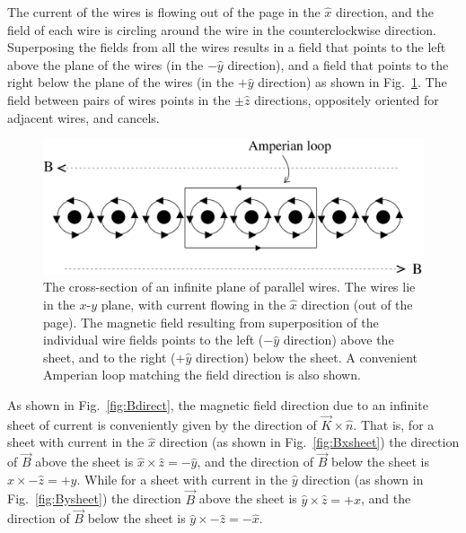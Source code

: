 \documentclass[12pt]{article}
\begin{document}
\begin{flushleft}
The current of the wires is flowing out of the page in the $\hat{x}$ direction, and the field of each wire is circling around the wire in the counterclockwise direction.  Superposing the fields from all the wires results in a field that points to the left above the plane of the wires (in the $-\hat{y}$ direction), and a field that points to the right below the plane of the wires (in the $+\hat{y}$ direction) as shown in Fig.~\ref{fig:sheetwB}.  The field between pairs of wires points in the $\pm \hat{z}$ directions, oppositely oriented for adjacent wires, and cancels.
\vspace{.2in}

\begin{figure}[h]
\centering
\includegraphics*[trim=0cm 0cm 0cm 0cm, clip=true, width=0.7\columnwidth]{IsheetwB.pdf}
\caption{\small The cross-section of an infinite plane of parallel wires.  The wires lie in the $x$-$y$ plane, with current flowing in the $\hat{x}$ direction (out of the page).  The magnetic field resulting from superposition of the individual wire fields points to the left ($-\hat{y}$ direction) above the sheet, and to the right  ($+\hat{y}$ direction) below the sheet.  A convenient Amperian loop matching the field direction is also shown.}
\label{fig:sheetwB}
\end{figure}
  
As shown in Fig.~\ref{fig:Bdirect}, the magnetic field direction due to an infinite sheet of current is conveniently given by the direction of $\vec{K} \times \hat{n}$.  That is, for a sheet with current in the $\hat{x}$ direction (as shown in Fig.~\ref{fig:Bxsheet}) the direction of $\vec{B}$ above the sheet is $\hat{x} \times \hat{z} = -\hat{y}$, and the direction of $\vec{B}$ below the sheet is $\hat{x} \times -\hat{z} = +\hat{y}$.  While for a sheet with current in the $\hat{y}$ direction (as shown in Fig.~\ref{fig:Bysheet}) the direction $\vec{B}$ above the sheet is $\hat{y} \times \hat{z} = +\hat{x}$, and the direction of $\vec{B}$ below the sheet is $\hat{y} \times -\hat{z} = -\hat{x}$.


\end{flushleft}
\end{document}
